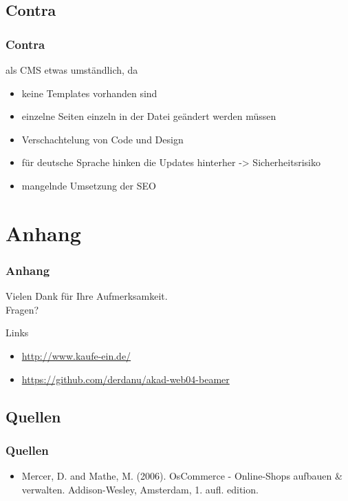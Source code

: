 \documentclass[xcolor=dvipsnames]{beamer}
\begin{document}
\subsection{Contra}
\begin{frame} %
  \frametitle{Contra} %
  \begin{alertblock}{als CMS etwas umständlich, da }
	  \begin{itemize}
		\item keine Templates vorhanden sind 
		\item einzelne Seiten einzeln in der Datei geändert werden müssen
		\item Verschachtelung von Code und Design
		\item für deutsche Sprache hinken die Updates hinterher -> Sicherheitsrisiko
		\item mangelnde Umsetzung der SEO
	  \end{itemize}
  \end{alertblock}
\end{frame}

\section{Anhang}
\begin{frame}
  \frametitle{Anhang} %
	\begin{block}{}	
		\begin{center}
			Vielen Dank für Ihre Aufmerksamkeit. \\
			Fragen?
		\end{center}	
	\end{block}
	\begin{block}{Links}	
		\begin{itemize}
			\item \url{http://www.kaufe-ein.de/}					
			\item \url{https://github.com/derdanu/akad-web04-beamer}	
		\end{itemize}
	\end{block}
\end{frame}

\subsection{Quellen}
\begin{frame} %
  \frametitle{Quellen} %
 	\begin{itemize}
		\item Mercer, D. and Mathe, M. (2006). OsCommerce - Online-Shops aufbauen \& verwalten. Addison-Wesley, Amsterdam, 1. aufl. edition.
	\end{itemize}
\end{frame}
\end{document}

